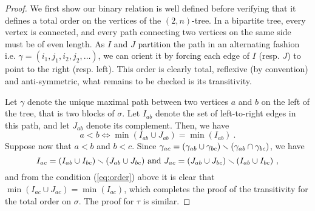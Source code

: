 \begin{proof}
We first show our binary relation is well defined before verifying that it defines a total order on the vertices of the $(2,n)$-tree.
In a bipartite tree, every vertex is connected, and every path connecting two vertices on the same side must be of even length. 
As $I$ and $J$ partition the path in an alternating fashion i.e. $\gamma=(i_1,j_1,i_2,j_2,\dots)$, we can orient it by forcing each edge of $I$ (resp. $J$) to point to the right (resp. left). 
This order is clearly total, reflexive (by convention) and anti-symmetric, what remains to be checked is its transitivity. 

Let $\gamma$ denote the unique maximal path between two vertices $a$ and $b$ on the left of the tree, that is two blocks of $\sigma$. 
Let $I_{ab}$ denote the set of left-to-right edges in this path, and let $J_{ab}$ denote its complement. 
Then, we have 
\begin{equation}
    \label{eq:order}
    a < b \iff \min(I_{ab}\cup J_{ab})=\min(I_{ab}) \ . 
\end{equation}
Suppose now that $a < b$ and $b < c$.
Since $\gamma_{ac}= (\gamma_{ab} \cup \gamma_{bc}) \smallsetminus (\gamma_{ab} \cap \gamma_{bc})$, we have $$ I_{ac}=(I_{ab}\cup I_{bc}) \smallsetminus (J_{ab} \cup J_{bc}) \text{ and } J_{ac}=(J_{ab}\cup J_{bc}) \smallsetminus (I_{ab} \cup I_{bc}) \ , $$ and from the condition (\ref{eq:order}) above it is clear that $\min(I_{ac}\cup J_{ac})=\min(I_{ac})$, which completes the proof of the transitivity for the total order on $\sigma$. 
The proof for $\tau$ is similar. 
\end{proof}

